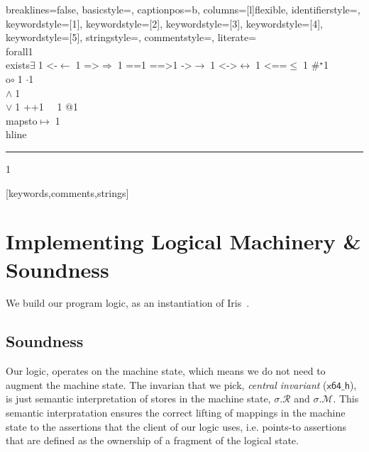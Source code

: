 {    %
    breaklines=false,
    basicstyle=\small,
    captionpos=b,
    columns=[l]flexible,
    identifierstyle={\ttfamily\color{black}},
    keywordstyle=[1]{\ttfamily\color{dkviolet}},
    keywordstyle=[2]{\ttfamily\color{dkgreen}},
    keywordstyle=[3]{\ttfamily\color{ltblue}},
    keywordstyle=[4]{\ttfamily\color{dkblue}},
    keywordstyle=[5]{\ttfamily\color{dkred}},
    stringstyle=\ttfamily,
    commentstyle={\ttfamily\color{dkgreen}},
    literate=
    {\\forall}{{\color{dkgreen}{$\forall\;$}}}1
    {\\exists}{{$\exists\;$}}1
    {<-}{{$\leftarrow\;$}}1
    {=>}{{$\Rightarrow\;$}}1
    {==}{{\code{==}\;}}1
    {==>}{{\code{==>}\;}}1
    {->}{{$\rightarrow\;$}}1
    {<->}{{$\leftrightarrow\;$}}1
    {<==}{{$\leq\;$}}1
    {\#}{{$^\star$}}1 
    {\\o}{{$\circ\;$}}1 
    {\@}{{$\cdot$}}1 
    {\/\\}{{$\wedge\;$}}1
    {\\\/}{{$\vee\;$}}1
    {++}{{\code{++}}}1
    {~}{{\ }}1
    {\@\@}{{$@$}}1
    {\\mapsto}{{$\mapsto\;$}}1
    {\\hline}{{\rule{\linewidth}{0.5pt}}}1
}[keywords,comments,strings]

\section{Implementing Logical Machinery \& Soundness}
We build our program logic, as an instantiation of Iris~\cite{jung2018iris}.
\subsection{Soundness}
\label{sec:soundness}
Our logic, operates on the machine state, which means we do not need to augment the machine state. The invarian that we pick, \textit{central invariant} ($\textsf{x64\_h}$), is just semantic interpretation of stores in the machine state, $\sigma.\mathcal{R}$ and $\sigma.\mathcal{M}$. This semantic interpratation ensures the correct lifting of mappings in the machine state to the assertions that the client of our logic uses, i.e. points-to assertions that are defined as the ownership of a fragment of the logical state.

